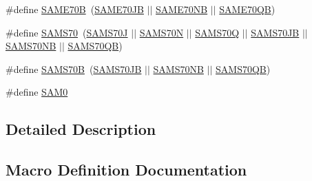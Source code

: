 \begin{DoxyCompactItemize}
\item 
\#define \mbox{\hyperlink{group__sam__part__macros__group_gaecbd1afa6c13b4c002054df6c7997a1f}{S\+A\+M\+E70B}}~(\mbox{\hyperlink{group__sam__part__macros__group_gaae0e6f6fcaa48e35111517b579509e64}{S\+A\+M\+E70\+JB}} $\vert$$\vert$ \mbox{\hyperlink{group__sam__part__macros__group_ga334dbf79ff94d8bf76c1fae1bebb36a0}{S\+A\+M\+E70\+NB}} $\vert$$\vert$ \mbox{\hyperlink{group__sam__part__macros__group_ga1a873ec232758ffa5fae2ba4f925f8f9}{S\+A\+M\+E70\+QB}})
\item 
\#define \mbox{\hyperlink{group__sam__part__macros__group_ga8d375463839ea94bd1bdbe23a1f87213}{S\+A\+M\+S70}}~(\mbox{\hyperlink{group__sam__part__macros__group_gaf1a96c282da9b05972a653cf0b03b1a2}{S\+A\+M\+S70J}} $\vert$$\vert$ \mbox{\hyperlink{group__sam__part__macros__group_ga058ef2915b804280b5d38280a5b2bae3}{S\+A\+M\+S70N}} $\vert$$\vert$ \mbox{\hyperlink{group__sam__part__macros__group_ga3cc6724a7388e59987ccd2b9c9b3e0eb}{S\+A\+M\+S70Q}} $\vert$$\vert$ \mbox{\hyperlink{group__sam__part__macros__group_gaec6e38f478ca1b4b598f598d3e1fb3ff}{S\+A\+M\+S70\+JB}} $\vert$$\vert$ \mbox{\hyperlink{group__sam__part__macros__group_ga7a21f0445e52881a10dcf99486ea5332}{S\+A\+M\+S70\+NB}} $\vert$$\vert$ \mbox{\hyperlink{group__sam__part__macros__group_ga7597e22e69b9ad51c748d9fbcc3c0a9e}{S\+A\+M\+S70\+QB}})
\item 
\#define \mbox{\hyperlink{group__sam__part__macros__group_ga6cb8954dcb5e856286f08e421be34e66}{S\+A\+M\+S70B}}~(\mbox{\hyperlink{group__sam__part__macros__group_gaec6e38f478ca1b4b598f598d3e1fb3ff}{S\+A\+M\+S70\+JB}} $\vert$$\vert$ \mbox{\hyperlink{group__sam__part__macros__group_ga7a21f0445e52881a10dcf99486ea5332}{S\+A\+M\+S70\+NB}} $\vert$$\vert$ \mbox{\hyperlink{group__sam__part__macros__group_ga7597e22e69b9ad51c748d9fbcc3c0a9e}{S\+A\+M\+S70\+QB}})
\item 
\#define \mbox{\hyperlink{group__sam__part__macros__group_ga5f347b54588ccfc00042a0272f1c0306}{S\+A\+M0}}
\end{DoxyCompactItemize}


\subsection{Detailed Description}


\subsection{Macro Definition Documentation}
\mbox{\label{group__sam__part__macros__group_gaa7c0614df11bc3398897ee31d038dde7}} 
